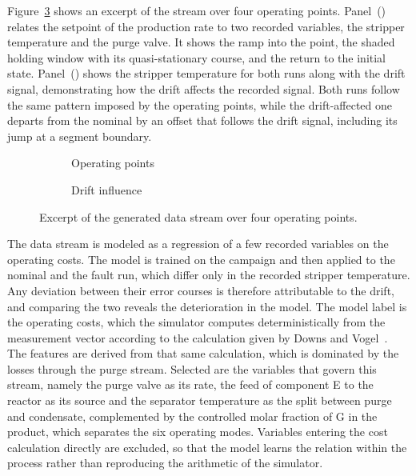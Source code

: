 %
Figure~\ref{fig:tep_stream} shows an excerpt of the stream over four operating points. Panel~() relates the setpoint of the production rate to two recorded variables, the stripper temperature and the purge valve. It shows the ramp into the point, the shaded holding window with its quasi-stationary course, and the return to the initial state. Panel~() shows the stripper temperature for both runs along with the drift signal, demonstrating how the drift affects the recorded signal. Both runs follow the same pattern imposed by the operating points, while the drift-affected one departs from the nominal by an offset that follows the drift signal, including its jump at a segment boundary. \par
%
\begin{figure}[tb]
    \centering
    \begin{subfigure}{\textwidth}
        \centering
        
        \caption{Operating points}
        \label{fig:tep_stream_point}
    \end{subfigure}
    \begin{subfigure}{\textwidth}
        \centering
        
        \caption{Drift influence}
        \label{fig:tep_stream_drift}
    \end{subfigure}
    \caption{Excerpt of the generated data stream over four operating points.}
    \label{fig:tep_stream}
\end{figure}
%
The data stream is modeled as a regression of a few recorded variables on the operating costs. The model is trained on the campaign and then applied to the nominal and the fault run, which differ only in the recorded stripper temperature. Any deviation between their error courses is therefore attributable to the drift, and comparing the two reveals the deterioration in the model. 
The model label is the operating costs, which the simulator computes deterministically from the measurement vector according to the calculation given by Downs and Vogel~\cite{downs.1993}. The features are derived from that same calculation, which is dominated by the losses through the purge stream. Selected are the variables that govern this stream, namely the purge valve as its rate, the feed of component E to the reactor as its source and the separator temperature as the split between purge and condensate, complemented by the controlled molar fraction of G in the product, which separates the six operating modes. Variables entering the cost calculation directly are excluded, so that the model learns the relation within the process rather than reproducing the arithmetic of the simulator. \par
